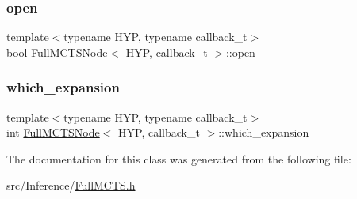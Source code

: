 \mbox{\label{class_full_m_c_t_s_node_ad2d8207e6e8b21d8bff3544ac1299764}} 
\subsubsection{\texorpdfstring{open}{open}}
{\footnotesize\ttfamily template$<$typename H\+YP, typename callback\+\_\+t$>$ \\
bool \hyperlink{class_full_m_c_t_s_node}{Full\+M\+C\+T\+S\+Node}$<$ H\+YP, callback\+\_\+t $>$\+::open}

\mbox{\label{class_full_m_c_t_s_node_acc931c9ebb39cd57d2dd0a87d125b20c}} 
\subsubsection{\texorpdfstring{which\+\_\+expansion}{which\_expansion}}
{\footnotesize\ttfamily template$<$typename H\+YP, typename callback\+\_\+t$>$ \\
int \hyperlink{class_full_m_c_t_s_node}{Full\+M\+C\+T\+S\+Node}$<$ H\+YP, callback\+\_\+t $>$\+::which\+\_\+expansion}



The documentation for this class was generated from the following file\+:\begin{DoxyCompactItemize}
\item 
src/\+Inference/\hyperlink{_full_m_c_t_s_8h}{Full\+M\+C\+T\+S.\+h}\end{DoxyCompactItemize}
